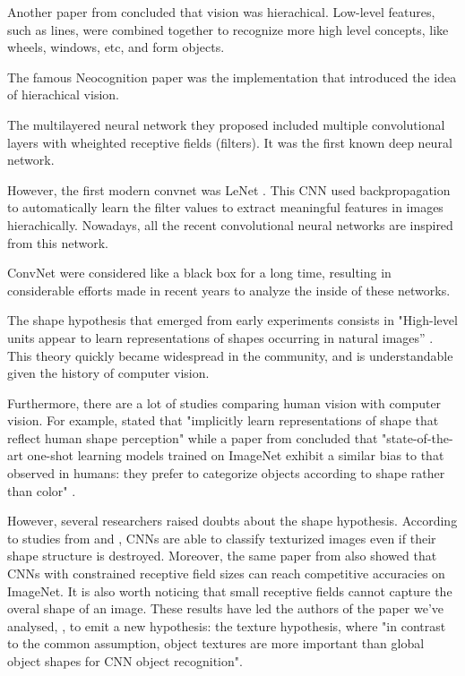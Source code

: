 \documentclass{article}
\begin{document}
\noindent 
Another paper from \cite{marr1982vision} concluded that vision was hierachical. Low-level features, such as lines,
were combined together to recognize more high level concepts, 
like wheels, windows, etc, and form objects. \medskip \par 

\noindent
The famous Neocognition paper \cite{neocognitron} was 
the implementation that introduced the idea of hierachical vision. 

\noindent
The multilayered neural network they proposed 
included multiple convolutional layers with wheighted receptive fields (filters).
It was the first known deep neural network. \medskip \par

\noindent
However, the first modern convnet was LeNet \cite{Lecun98gradient-basedlearning}.
This CNN used backpropagation to automatically learn the filter values to extract meaningful 
features in images hierachically.
Nowadays, all the recent convolutional neural networks are inspired from this network. \medskip \par

\noindent
ConvNet were considered like a black box for a long time, 
resulting in considerable efforts made in
recent years to analyze the inside of these networks. \medskip \par

\noindent
The shape hypothesis that emerged from early experiments consists in
"High-level units appear to learn representations of shapes occurring in natural images” 
\cite{Kriegeskorte029876}. This theory quickly became widespread in the community, and
is understandable given the history of computer vision. \medskip \par

\noindent
Furthermore, there are a lot of studies comparing human vision with computer vision. For example,
\cite{kubiliusshape} stated that 
"implicitly learn representations of shape that reflect human shape perception"
while a paper from \cite{ritter2017cognitive} concluded that 
"state-of-the-art one-shot learning models trained on ImageNet exhibit  
a similar bias to that observed in humans: they prefer to categorize objects according  
to shape rather than color" . \medskip \par

\noindent
However, several researchers raised doubts about the shape hypothesis.
According to studies from \cite{gatys2017textures} and \cite{brendel2019approximating}, 
CNNs are able to classify texturized images even if their shape structure is destroyed.
Moreover, the same paper from \cite{brendel2019approximating} also
showed that CNNs with constrained receptive field sizes can reach competitive accuracies on ImageNet.
It is also worth noticing that small receptive fields cannot capture the overal shape of an image.
These results have led the authors of the paper we've analysed, \cite{geirhos2018imagenettrained}, 
to emit a new hypothesis: the texture hypothesis, where "in contrast to the
common assumption, object textures are more important than global object shapes for CNN object
recognition". \medskip \par
\end{document}
